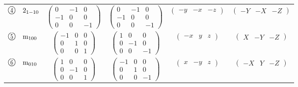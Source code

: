 \documentclass[fleqn,10pt,landscape]{jsarticle}
\begin{document}
\begin{center}
\begin{longtable}{lcccc}
$ {\ooalign{\hfil\resizebox{.8\width}{\height}{4}\hfil\crcr\raise.1ex\hbox{\large$\bigcirc$}}}\quad 2{}_{1-10} $ & $ \begin{pmatrix} 0 & -1 & 0 \\ -1 & 0 & 0 \\ 0 & 0 & -1 \end{pmatrix} $ & $ \begin{pmatrix} 0 & -1 & 0 \\ -1 & 0 & 0 \\ 0 & 0 & -1 \end{pmatrix} $ & $ \begin{pmatrix} - y & - x & - z \end{pmatrix} $ & $ \begin{pmatrix} - Y & - X & - Z \end{pmatrix} $ \\
$ {\ooalign{\hfil\resizebox{.8\width}{\height}{5}\hfil\crcr\raise.1ex\hbox{\large$\bigcirc$}}}\quad {\rm m}_{100} $ & $ \begin{pmatrix} -1 & 0 & 0 \\ 0 & 1 & 0 \\ 0 & 0 & 1 \end{pmatrix} $ & $ \begin{pmatrix} 1 & 0 & 0 \\ 0 & -1 & 0 \\ 0 & 0 & -1 \end{pmatrix} $ & $ \begin{pmatrix} - x & y & z \end{pmatrix} $ & $ \begin{pmatrix} X & - Y & - Z \end{pmatrix} $ \\
$ {\ooalign{\hfil\resizebox{.8\width}{\height}{6}\hfil\crcr\raise.1ex\hbox{\large$\bigcirc$}}}\quad {\rm m}_{010} $ & $ \begin{pmatrix} 1 & 0 & 0 \\ 0 & -1 & 0 \\ 0 & 0 & 1 \end{pmatrix} $ & $ \begin{pmatrix} -1 & 0 & 0 \\ 0 & 1 & 0 \\ 0 & 0 & -1 \end{pmatrix} $ & $ \begin{pmatrix} x & - y & z \end{pmatrix} $ & $ \begin{pmatrix} - X & Y & - Z \end{pmatrix} $ \\

\end{longtable}
\end{center}
\end{document}

